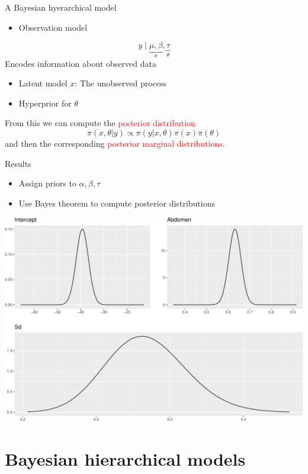 \documentclass[
  ignorenonframetext,
]{beamer}
\providecommand{\tightlist}{%
  \setlength{\itemsep}{0pt}\setlength{\parskip}{0pt}}
\begin{document}
\begin{frame}{A Bayesian hyerarchical model}
\protect\hypertarget{a-bayesian-hyerarchical-model}{}
\begin{itemize}
\tightlist
\item
  Observation model
\end{itemize}

\[
y \mid \underbrace{\mu,
            \beta}_{{x}}, \underbrace{\tau}_\theta
\] Encodes information about observed data

\begin{itemize}
\item
  Latent model \(x\): The unobserved process
\item
  Hyperprior for \(\theta\)
\end{itemize}

\pause

From this we can compute the \textcolor{red}{posterior distribution} \[
\pi(x, \theta | y) \propto \pi(y | x,
     \theta) \pi(x) \pi(\theta)
\] and then the corresponding
\textcolor{red}{posterior marginal distributions}.
\end{frame}

\begin{frame}{Results}
\protect\hypertarget{results}{}
\begin{itemize}
\tightlist
\item
  Assign priors to \(\alpha,\beta,\tau\)
\item
  Use Bayes theorem to compute posterior distributions
\end{itemize}

\begin{center}\includegraphics[width=0.6\linewidth]{Part1_intro_files/figure-beamer/unnamed-chunk-9-1} \end{center}
\end{frame}

\hypertarget{bayesian-hierarchical-models}{%
\section{Bayesian hierarchical
models}\label{bayesian-hierarchical-models}}
\end{document}
